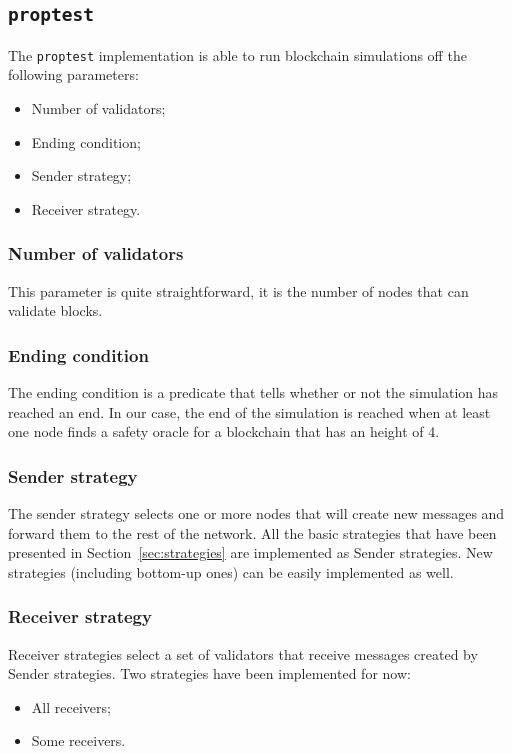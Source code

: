 \subsection{\texttt{proptest}}
The \texttt{proptest} implementation is able to run blockchain simulations off
the following parameters:
\begin{itemize}
    \item Number of validators;
    \item Ending condition;
    \item Sender strategy;
    \item Receiver strategy.
\end{itemize}

\subsubsection{Number of validators}
This parameter is quite straightforward, it is the number of nodes that can
validate blocks.

\subsubsection{Ending condition}
The ending condition is a predicate that tells whether or not the simulation has
reached an end. In our case, the end of the simulation is reached when at least
one node finds a safety oracle for a blockchain that has an height of 4.

\subsubsection{Sender strategy}
The sender strategy selects one or more nodes that will create new messages and
forward them to the rest of the network. All the basic strategies that have been
presented in Section~\ref{sec:strategies} are implemented as Sender strategies.
New strategies (including bottom-up ones) can be easily implemented as well.

\subsubsection{Receiver strategy}
Receiver strategies select a set of validators that receive messages created by
Sender strategies. Two strategies have been implemented for now: 
\begin{itemize}
        \item All receivers;
        \item Some receivers.
\end{itemize}

